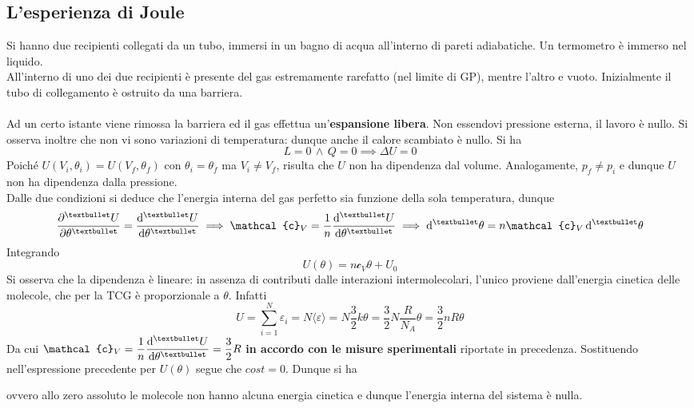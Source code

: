 \documentclass[10pt, oneside]{book}
\newcommand{\mean}[1]{\langle #1 \rangle}
\newcommand{\lawbox}[2]{\begin{center}
\framebox{
\parbox{\linewidth}{
\vspace{0.3cm}
\textbf{#1} \hfill $\displaystyle #2$
\vspace{0.3cm}
}
}
\end{center}}
\newcommand{\ds}{\displaystyle}
\newcommand{\molhtv}{\mathcal{c}_V }
\begin{document}
\subsection{L'esperienza di Joule}
Si hanno due recipienti collegati da un tubo, immersi in un bagno di acqua all'interno di pareti adiabatiche. Un termometro è immerso nel liquido.\\
All'interno di uno dei due recipienti è presente del gas estremamente rarefatto (nel limite di GP), mentre l'altro e vuoto. Inizialmente il tubo di collegamento è ostruito da una barriera.
\\~\\Ad un certo istante viene rimossa la barriera ed il gas effettua un'\textbf{espansione libera}. Non essendovi pressione esterna, il lavoro è nullo. Si osserva inoltre che non vi sono variazioni di temperatura: dunque anche il calore scambiato è nullo. Si ha
\[L = 0 \, \land \, Q = 0 \implies \Delta U = 0\]
Poiché $U(V_i, \theta_i) = U(V_f, \theta_f)$ con $\theta_i = \theta_f$ ma $V_i \neq V_f$, risulta che $U$ non ha dipendenza dal volume. Analogamente, $p_f \neq p_i$ e dunque $U$ non ha dipendenza dalla pressione. \\Dalle due condizioni si deduce che l'energia interna del gas perfetto sia funzione della sola temperatura, dunque
\[\pdv[•]{U}{\theta} = \dv[•]{U}{\theta} \implies \molhtv = \frac{1}{n} \dv[•]{U}{\theta} \implies \dd[•]{\theta} = n \molhtv \dd[•]{\theta}\]
Integrando
\[U(\theta) = n \molhtv \theta + U_0\]
Si osserva che la dipendenza è lineare: in assenza di contributi dalle interazioni intermolecolari, l'unico proviene dall'energia cinetica delle molecole, che per la TCG è proporzionale a $\theta$. Infatti
\[U = \sum\limits_{i=1}^N \varepsilon_i = N \mean{\varepsilon} = N \frac{3}{2}k \theta = \frac{3}{2}N\frac{R}{N_A} \theta = \frac{3}{2}nR\theta\]
Da cui $\ds \molhtv = \frac{1}{n} \dv[•]{U}{\theta} = \frac{3}{2}R$ \textbf{in accordo con le misure sperimentali} riportate in precedenza. Sostituendo nell'espressione precedente per $U(\theta)$ segue che $cost = 0$. Dunque si ha
\lawbox{Energia interna GP}{U(\theta) = n \molhtv \theta}
ovvero allo zero assoluto le molecole non hanno alcuna energia cinetica e dunque l'energia interna del sistema è nulla.
\end{document}
